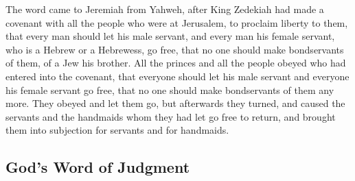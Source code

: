 \begin{paracol}{2}
\begin{otherlanguage}{english}
 The word came to Jeremiah from Yahweh, after King
Zedekiah had made a covenant with all the people who were at Jerusalem,
to proclaim liberty to them,  that every man should let
his male servant, and every man his female servant, who is a Hebrew or a
Hebrewess, go free, that no one should make bondservants of them, of a
Jew his brother.  All the princes and all the people
obeyed who had entered into the covenant, that everyone should let his
male servant and everyone his female servant go free, that no one should
make bondservants of them any more. They obeyed and let them go,
 but afterwards they turned, and caused the servants and
the handmaids whom they had let go free to return, and brought them into
subjection for servants and for handmaids.

\hypertarget{gods-word-of-judgment}{%
\subsection{God's Word of Judgment}\label{gods-word-of-judgment}}


\end{otherlanguage}
\end{paracol}
